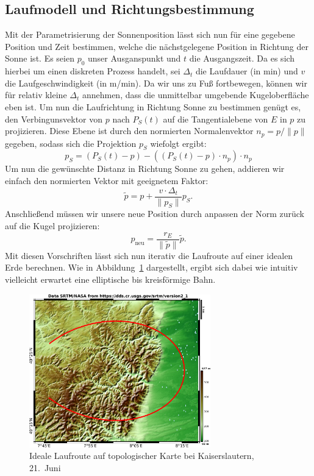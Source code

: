 \documentclass[
    paper=a4,
    DIV14,
    fontsize=12pt,
    pagesize=pdftex,
    toc=bibliographynumbered
]{scrartcl}
\numberwithin{figure}{section}
\numberwithin{equation}{section}
\numberwithin{table}{section}
\begin{document}
\subsection{Laufmodell und Richtungsbestimmung}
Mit der Parametrisierung der Sonnenposition lässt sich nun für eine gegebene Position und
Zeit bestimmen, welche die nächstgelegene Position in Richtung der Sonne ist. Es seien
$p_0$ unser Ausganspunkt und $t$ die Ausgangszeit. Da es sich hierbei um einen diskreten
Prozess handelt, sei $\Delta_t$ die Laufdauer (in min) und $v$ die Laufgeschwindigkeit (in
m/min). Da wir uns zu Fuß fortbewegen, können wir für relativ kleine $\Delta_t$ annehmen,
dass die unmittelbar umgebende Kugeloberfläche eben ist. Um nun die Laufrichtung in
Richtung Sonne zu bestimmen genügt es, den Verbingunsvektor von $p$ nach $P_S(t)$ auf die
Tangentialebene von $E$ in $p$ zu projizieren. Diese Ebene ist durch den normierten
Normalenvektor $n_p = p/\|p\|$ gegeben, sodass sich die Projektion $p_S$ wiefolgt ergibt:
\begin{equation*}
    p_S = \left( P_S(t) - p \right) - \left( (P_S(t) - p)\cdot n_p \right) \cdot
    n_p
\end{equation*}
Um nun die gewünschte Distanz in Richtung Sonne zu gehen, addieren wir einfach den normierten
Vektor mit geeignetem Faktor:
\begin{equation*}
    \tilde p = p + \frac{v\cdot\Delta_t}{\|p_S\|} p_S.
\end{equation*}
Anschließend müssen wir unsere neue Position durch anpassen der Norm zurück auf die Kugel
projizieren:
\begin{equation}
    p_{\text{neu}} = \frac{r_E}{\|\tilde p\|}\tilde p.
    \label{eq:pneu}
\end{equation}
Mit diesen Vorschriften lässt sich nun iterativ die Laufroute auf einer idealen Erde
berechnen. Wie in Abbildung~\ref{fig:sonnenmodellroute} dargestellt, ergibt sich dabei wie
intuitiv vielleicht erwartet eine elliptische bis kreisförmige Bahn.

\begin{figure}[ht]
    \centering
    \includegraphics[width=0.7\textwidth]{images/ideal.png}
    \caption{Ideale Laufroute auf topologischer Karte bei Kaiserslautern, 21.\ Juni}
    \label{fig:sonnenmodellroute}
\end{figure}
\end{document}
